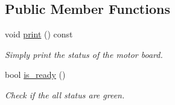 \subsection*{Public Member Functions}
\begin{DoxyCompactItemize}
\item 
void \hyperlink{classblmc__drivers_1_1MotorBoardStatus_ac050ae0cdf1c6e56ebd241c41330a42d}{print} () const \hypertarget{classblmc__drivers_1_1MotorBoardStatus_ac050ae0cdf1c6e56ebd241c41330a42d}{}\label{classblmc__drivers_1_1MotorBoardStatus_ac050ae0cdf1c6e56ebd241c41330a42d}

\begin{DoxyCompactList}\small\item\em Simply print the status of the motor board. \end{DoxyCompactList}\item 
bool \hyperlink{classblmc__drivers_1_1MotorBoardStatus_a1da75ba70f6ad31fa7c880b5c673cc89}{is\+\_\+ready} ()
\begin{DoxyCompactList}\small\item\em Check if the all status are green. \end{DoxyCompactList}\end{DoxyCompactItemize}
